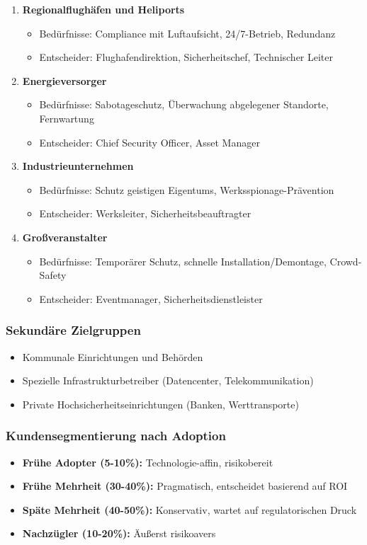 \documentclass[11pt,a4paper]{article}
\begin{document}
\begin{enumerate}
\item \textbf{Regionalflughäfen und Heliports}
\begin{itemize}
\item Bedürfnisse: Compliance mit Luftaufsicht, 24/7-Betrieb, Redundanz
\item Entscheider: Flughafendirektion, Sicherheitschef, Technischer Leiter
\end{itemize}

\item \textbf{Energieversorger}
\begin{itemize}
\item Bedürfnisse: Sabotageschutz, Überwachung abgelegener Standorte, Fernwartung
\item Entscheider: Chief Security Officer, Asset Manager
\end{itemize}

\item \textbf{Industrieunternehmen}
\begin{itemize}
\item Bedürfnisse: Schutz geistigen Eigentums, Werksspionage-Prävention
\item Entscheider: Werksleiter, Sicherheitsbeauftragter
\end{itemize}

\item \textbf{Großveranstalter}
\begin{itemize}
\item Bedürfnisse: Temporärer Schutz, schnelle Installation/Demontage, Crowd-Safety
\item Entscheider: Eventmanager, Sicherheitsdienstleister
\end{itemize}
\end{enumerate}

\subsubsection*{Sekundäre Zielgruppen}
\begin{itemize}
\item Kommunale Einrichtungen und Behörden
\item Spezielle Infrastrukturbetreiber (Datencenter, Telekommunikation)
\item Private Hochsicherheitseinrichtungen (Banken, Werttransporte)
\end{itemize}

\subsubsection*{Kundensegmentierung nach Adoption}
\begin{itemize}
\item \textbf{Frühe Adopter (5-10\%):} Technologie-affin, risikobereit
\item \textbf{Frühe Mehrheit (30-40\%):} Pragmatisch, entscheidet basierend auf ROI
\item \textbf{Späte Mehrheit (40-50\%):} Konservativ, wartet auf regulatorischen Druck
\item \textbf{Nachzügler (10-20\%):} Äußerst risikoavers
\end{itemize}
\end{document}
